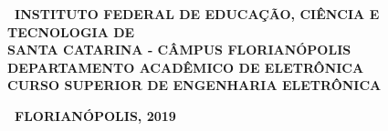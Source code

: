\documentclass{ifscTCC} %
\begin{document}
\frenchspacing 

\begin{capa}%
    \begin{SingleSpacing}
        \center\ABNTEXchapterfont\bfseries\ INSTITUTO FEDERAL DE EDUCAÇÃO, CIÊNCIA E TECNOLOGIA DE\\SANTA CATARINA - CÂMPUS FLORIANÓPOLIS\\DEPARTAMENTO ACADÊMICO DE ELETRÔNICA\\CURSO SUPERIOR DE ENGENHARIA ELETRÔNICA
        
        \vspace*{3.0cm}     %
        
        \ABNTEXchapterfont\bfseries\MakeUppercase\imprimirautor

        \begin{vplace}[0.5]
            \begin{center}
                \ABNTEXchapterfont\SingleSpacing\bfseries\Large\MakeUppercase\imprimirtitulo
            \end{center}
        \end{vplace}
        
        \begin{center}
            \ABNTEXchapterfont\bfseries\ FLORIANÓPOLIS, 2019
        \end{center}
    \end{SingleSpacing}
\end{capa}
\end{document}

